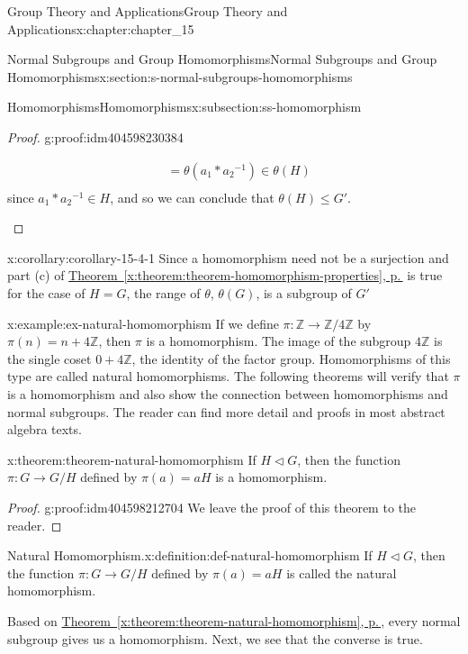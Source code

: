 \documentclass[twoside,10pt,]{book}
\newcommand{\xreffont}{\relax}
\numberwithin{equation}{section}
\begin{document}
\begin{chapterptx}{Group Theory and Applications}{}{Group Theory and Applications}{}{}{x:chapter:chapter_15}
\begin{sectionptx}{Normal Subgroups and Group Homomorphisms}{}{Normal Subgroups and Group Homomorphisms}{}{}{x:section:s-normal-subgroups-homomorphisms}
\begin{subsectionptx}{Homomorphisms}{}{Homomorphisms}{}{}{x:subsection:ss-homomorphism}
\begin{proof}{}{g:proof:idm404598230384}
\begin{enumerate}[label=(\alph*)]
\begin{equation*}
\begin{split}
& =\theta\left(a_1*a_2{}^{-1}\right)\in \theta(H)\\
\end{split}
\end{equation*}
since  \(a_1*a_2{}^{-1}\in H\), and so we can conclude that  \(\theta(H)\leq G'\).%
\end{enumerate}
%
\end{proof}
\begin{corollary}{}{}{x:corollary:corollary-15-4-1}%
Since a homomorphism need not be a surjection and part (c) of \hyperref[x:theorem:theorem-homomorphism-properties]{Theorem~{\xreffont\ref{x:theorem:theorem-homomorphism-properties}}, p.\,\pageref{x:theorem:theorem-homomorphism-properties}} is true for the case of \(H = G\), the range of \(\theta\), \(\theta(G)\), is a subgroup of \(G'\)%
\end{corollary}
\begin{example}{}{x:example:ex-natural-homomorphism}%
If we define \(\pi: \mathbb{Z} \rightarrow  \mathbb{Z}/4\mathbb{Z}\) by \(\pi(n) = n + 4\mathbb{Z}\), then \(\pi\) is a homomorphism. The image of the subgroup \(4\mathbb{Z}\) is the single coset \(0 + 4\mathbb{Z}\), the identity of the factor group. Homomorphisms of this type are called natural homomorphisms.  The following theorems will verify that \(\pi\) is a homomorphism and also show the connection between homomorphisms and normal subgroups. The reader can find more detail and proofs in most abstract algebra texts.%
\end{example}
\begin{theorem}{}{}{x:theorem:theorem-natural-homomorphism}%
If \(H \triangleleft  G\), then the function \(\pi:G\to  G/H\) defined by \(\pi(a) = a H\) is a homomorphism.%
\end{theorem}
\begin{proof}{}{g:proof:idm404598212704}
We leave the proof of this theorem to the reader.%
\end{proof}
\begin{definition}{Natural Homomorphism.}{x:definition:def-natural-homomorphism}%
%
If \(H \triangleleft  G\), then the function \(\pi:G\to  G/H\) defined by \(\pi(a) = a H\) is called the natural homomorphism.%
\end{definition}
Based on \hyperref[x:theorem:theorem-natural-homomorphism]{Theorem~{\xreffont\ref{x:theorem:theorem-natural-homomorphism}}, p.\,\pageref{x:theorem:theorem-natural-homomorphism}}, every normal subgroup gives us a homomorphism.  Next, we see that the converse is true.%

\end{subsectionptx}
\end{sectionptx}
\end{chapterptx}
\end{document}
